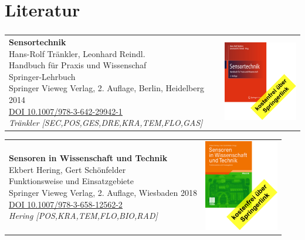 \section{Literatur}
\begin{frame}
    \frametitle{\insertsection}
   
    \begin{tabular}{m{}m{}}
        \parbox{0.7\textwidth}{\textbf{Sensortechnik}\\Hans-Rolf Tränkler, Leonhard Reindl.\\Handbuch für Praxis und Wissenschaf\\Springer-Lehrbuch\\Springer Vieweg Verlag, 2. Auflage, Berlin, Heidelberg 2014\\
        \href{https://link.springer.com/book/10.1007/978-3-642-29942-1}{\underline{DOI 10.1007/978-3-642-29942-1}}\\
        \emph{Tränkler [SEC,POS,GES,DRE,KRA,TEM,FLO,GAS]}} &\includegraphics[height=4cm]{fig/Sensortechnik}\\
    \end{tabular}


    \begin{tabular}{m{}m{}}
        \parbox{0.7\textwidth}{\textbf{Sensoren in Wissenschaft und Technik}\\Ekbert Hering, Gert Schönfelder\\Funktionsweise und Einsatzgebiete\\Springer Vieweg Verlag, 2. Auflage, Wiesbaden 2018\\
        \href{https://link.springer.com/book/10.1007/978-3-658-12562-2}{\underline{DOI 10.1007/978-3-658-12562-2}}\\
        \emph{Hering [POS,KRA,TEM,FLO,BIO,RAD]}} &\includegraphics[height=4cm]{fig/sensoren_in_wissenschaft_und_technik}\\
    \end{tabular}

    
\end{frame}

